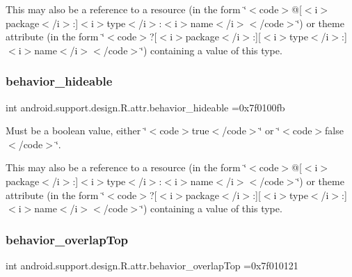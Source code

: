 This may also be a reference to a resource (in the form \char`\"{}$<$code$>$@\mbox{[}$<$i$>$package$<$/i$>$\+:\mbox{]}$<$i$>$type$<$/i$>$\+:$<$i$>$name$<$/i$>$$<$/code$>$\char`\"{}) or theme attribute (in the form \char`\"{}$<$code$>$?\mbox{[}$<$i$>$package$<$/i$>$\+:\mbox{]}\mbox{[}$<$i$>$type$<$/i$>$\+:\mbox{]}$<$i$>$name$<$/i$>$$<$/code$>$\char`\"{}) containing a value of this type. \mbox{\label{classandroid_1_1support_1_1design_1_1R_1_1attr_a0dd161810c2e6f6a7dd186e8d3d7d290}} 
\subsubsection{\texorpdfstring{behavior\+\_\+hideable}{behavior\_hideable}}
{\footnotesize\ttfamily int android.\+support.\+design.\+R.\+attr.\+behavior\+\_\+hideable =0x7f0100fb\hspace{0.3cm}{\ttfamily [static]}}

Must be a boolean value, either \char`\"{}$<$code$>$true$<$/code$>$\char`\"{} or \char`\"{}$<$code$>$false$<$/code$>$\char`\"{}. 

This may also be a reference to a resource (in the form \char`\"{}$<$code$>$@\mbox{[}$<$i$>$package$<$/i$>$\+:\mbox{]}$<$i$>$type$<$/i$>$\+:$<$i$>$name$<$/i$>$$<$/code$>$\char`\"{}) or theme attribute (in the form \char`\"{}$<$code$>$?\mbox{[}$<$i$>$package$<$/i$>$\+:\mbox{]}\mbox{[}$<$i$>$type$<$/i$>$\+:\mbox{]}$<$i$>$name$<$/i$>$$<$/code$>$\char`\"{}) containing a value of this type. \mbox{\label{classandroid_1_1support_1_1design_1_1R_1_1attr_a8c200503a438286a0bccc4c94c42a7d1}} 
\subsubsection{\texorpdfstring{behavior\+\_\+overlap\+Top}{behavior\_overlapTop}}
{\footnotesize\ttfamily int android.\+support.\+design.\+R.\+attr.\+behavior\+\_\+overlap\+Top =0x7f010121\hspace{0.3cm}{\ttfamily [static]}}

